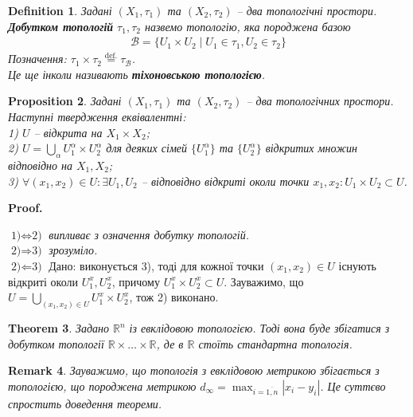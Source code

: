 \documentclass[a4paper, 10pt]{article}
\makeatletter
\theoremstyle{theoremdd}
\newtheorem{theorem}{Theorem}[subsection]
\newtheorem{definition}[theorem]{Definition}
\newtheorem{proposition}[theorem]{Proposition}
\newtheorem{remark}[theorem]{Remark}
\renewenvironment{proof}[1][Proof.\\]{\par
\pushQED{\hfill \qed}%
\normalfont \topsep6\p@\@plus6\p@\relax
\trivlist
\item\relax
{\bfseries
#1\@addpunct{.}}\hspace\labelsep\ignorespaces
}{%
\popQED\endtrivlist\@endpefalse
}
\makeatother
\begin{document}
\begin{definition}
Задані $(X_1,\tau_1)$ та $(X_2,\tau_2)$ -- два топологічні простори.\\
\textbf{Добутком топологій} $\tau_1,\tau_2$ назвемо топологію, яка породжена базою
\begin{align*}
\mathcal{B} = \{U_1 \times U_2 \mid U_1 \in \tau_1, U_2 \in \tau_2\}
\end{align*}
Позначення: $\tau_1 \times \tau_2 \overset{\text{def.}}{=} \tau_{\mathcal{B}}$.\\
Це ще інколи називають \textbf{тіхоновською топологією}.
\end{definition}

\begin{proposition}
Задані $(X_1,\tau_1)$ та $(X_2,\tau_2)$ -- два топологічних простори. Наступні твердження еквівалентні:\\
1) $U$ -- відкрита на $X_1 \times X_2$;\\
2) $U = \displaystyle\bigcup_\alpha U_1^\alpha \times U_2^\alpha$ для деяких сімей $\{U_1^\alpha\}$ та $\{U_2^\alpha\}$ відкритих множин відповідно на $X_1,X_2$;\\
3) $\forall (x_1,x_2) \in U: \exists U_1,U_2$ -- відповідно відкриті околи точки $x_1,x_2: U_1 \times U_2 \subset U$.
\end{proposition}

\begin{proof}
$\boxed{\text{1)} \Leftrightarrow \text{2)}}$ \textit{випливає з означення добутку топологій.}
\bigskip \\
$\boxed{\text{2)} \Rightarrow \text{3)}}$ \textit{зрозуміло.}
\bigskip \\
$\boxed{\text{2)} \Leftarrow \text{3)}}$ Дано: виконується 3), тоді для кожної точки $(x_1,x_2) \in U$ існують відкриті околи $U_1^x,U_2^x$, причому $U_1^x \times U_2^x \subset U$. Зауважимо, що $U = \displaystyle\bigcup_{(x_1,x_2) \in U} U_1^x \times U_2^x$, тож 2) виконано.
\end{proof}

\begin{theorem}
Задано $\mathbb{R}^n$ із евклідовою топологією. Тоді вона буде збігатися з добутком топології $\mathbb{R} \times \dots \times \mathbb{R}$, де в $\mathbb{R}$ стоїть стандартна топологія.
\end{theorem}

\begin{remark}
Зауважимо, що топологія з евклідовою метрикою збігається з топологією, що породжена метрикою $d_\infty = \displaystyle\max_{i = \overline{1,n}} |x_i-y_i|$. Це суттєво спростить доведення теореми.
\end{remark}
\end{document}
